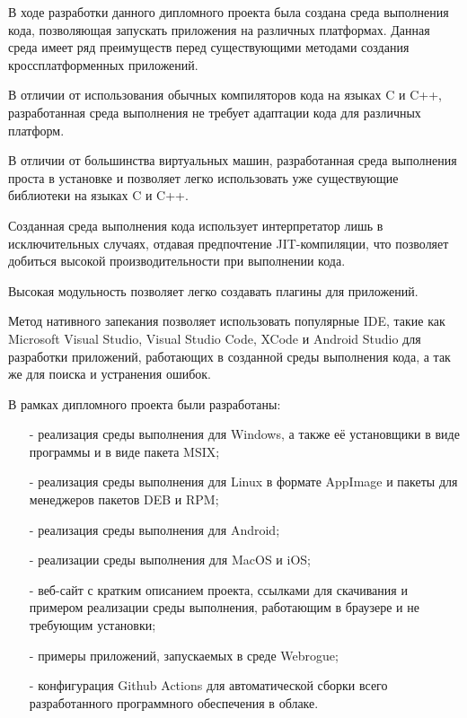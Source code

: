 В ходе разработки данного дипломного проекта была создана среда выполнения кода, позволяющая запускать приложения на различных платформах.
Данная среда имеет ряд преимуществ перед существующими методами создания кроссплатформенных приложений.

В отличии от использования обычных компиляторов кода на языках C и C++, разработанная среда выполнения не требует адаптации кода для различных платформ. 

В отличии от большинства виртуальных машин, разработанная среда выполнения проста в установке и позволяет легко использовать уже существующие библиотеки на языках C и C++.

Созданная среда выполнения кода использует интерпретатор лишь в исключительных случаях, отдавая предпочтение JIT-компиляции, что позволяет добиться высокой производительности при выполнении кода.

Высокая модульность позволяет легко создавать плагины для приложений.

Метод нативного запекания позволяет использовать популярные IDE, такие как Microsoft Visual Studio, Visual Studio Code, XCode и Android Studio для разработки приложений, работающих в созданной среды выполнения кода, а так же для поиска и устранения ошибок.

В рамках дипломного проекта были разработаны:
\begin{itemize}
    \item[-] реализация среды выполнения для Windows, а также её установщики в виде программы и в виде пакета MSIX;
    \item[-] реализация среды выполнения для Linux в формате AppImage и пакеты для менеджеров пакетов DEB и RPM;
    \item[-] реализация среды выполнения для Android;
    \item[-] реализации среды выполнения для MacOS и iOS;
    \item[-] веб-сайт с кратким описанием проекта, ссылками для скачивания и примером реализации среды выполнения, работающим в браузере и не требующим установки;
    \item[-] примеры приложений, запускаемых в среде Webrogue;
    \item[-] конфигурация Github Actions для автоматической сборки всего разработанного программного обеспечения в облаке.
\end{itemize}

